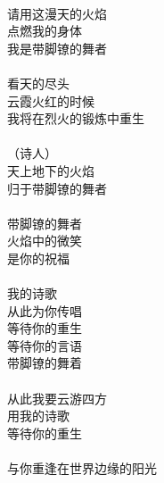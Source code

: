 \\
请用这漫天的火焰\\
点燃我的身体\\
我是带脚镣的舞者\\
\\
看天的尽头\\
云霞火红的时候\\
我将在烈火的锻炼中重生\\
\\
（诗人）\\
天上地下的火焰\\
归于带脚镣的舞者\\
\\
带脚镣的舞者\\
火焰中的微笑\\
是你的祝福\\
\\
我的诗歌\\
从此为你传唱\\
等待你的重生\\
等待你的言语\\
带脚镣的舞着\\
\\
从此我要云游四方\\
用我的诗歌\\
等待你的重生\\
\\
与你重逢在世界边缘的阳光
